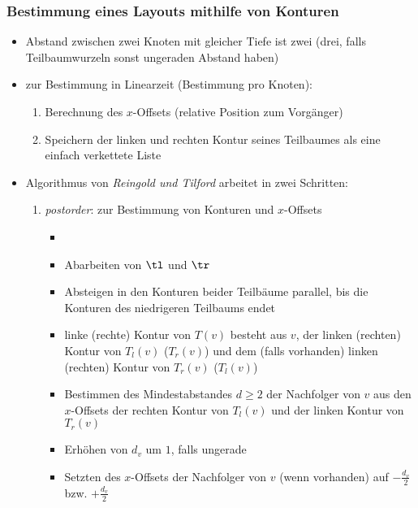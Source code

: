 \subsubsection{Bestimmung eines Layouts mithilfe von Konturen}
\begin{itemize}[itemsep=-1pt]
	\item Abstand zwischen zwei Knoten mit gleicher Tiefe ist zwei (drei, falls Teilbaumwurzeln sonst ungeraden Abstand haben)
	\item zur Bestimmung in Linearzeit (Bestimmung pro Knoten):
		\begin{enumerate}
			\item Berechnung des $x$-Offsets (relative Position zum Vorgänger)
			\item Speichern der linken und rechten Kontur seines Teilbaumes als eine einfach verkettete Liste
		\end{enumerate}
	\item Algorithmus von \textit{Reingold und Tilford} arbeitet in zwei Schritten:
		\begin{enumerate}
			\item \textit{postorder}: zur Bestimmung von Konturen und $x$-Offsets\\
			\begin{minipage}{0.43\textwidth}
				
			\end{minipage}
			\begin{minipage}{0.47\textwidth}
				\begin{itemize}[itemsep=-1pt]
					\item[] 
					\item Abarbeiten von $\tl$ und $\tr$
					\item Absteigen in den Konturen beider Teilbäume parallel, bis die Konturen des niedrigeren Teilbaums endet
					\item linke (rechte) Kontur von $T(v)$ besteht aus $v$, der linken (rechten) Kontur von $T_l(v)$ ($T_r(v)$) und dem (falls vorhanden) linken (rechten) Kontur von $T_r(v)$ ($T_l(v)$)
					\item Bestimmen des Mindestabstandes $d\geq 2$ der Nachfolger von $v$ aus den $x$-Offsets der rechten Kontur von $T_l(v)$ und der linken Kontur von $T_r(v)$
					\item Erhöhen von $d_v$ um $1$, falls ungerade
					\item Setzten des $x$-Offsets der Nachfolger von $v$ (wenn vorhanden) auf $-\frac{d_v}{2}$ bzw. $+\frac{d_v}{2}$
				\end{itemize}

\end{minipage}
\end{enumerate}
\end{itemize}
